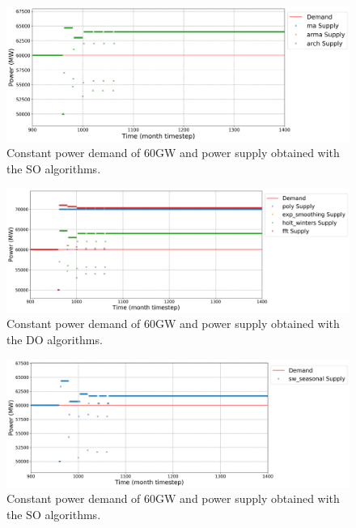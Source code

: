 \documentclass[11pt]{article}
\begin{document}
\begin{figure}[H]
	\centering
	\includegraphics[width=\textwidth]{29-figures/29-power0-buffer01.png} 
	\hfill
	\caption{Constant power demand of 60GW and power supply obtained with the SO algorithms.}
	\label{fig:29-NO}
\end{figure}

\begin{figure}[H]
	\centering
	\includegraphics[width=\textwidth]{29-figures/29-power0-buffer02.png} 
	\hfill
	\caption{Constant power demand of 60GW and power supply obtained with the DO algorithms.}
	\label{fig:29-DO}
\end{figure}

\begin{figure}[H]
	\centering
	\includegraphics[width=\textwidth]{29-figures/29-power0-buffer03.png} 
	\hfill
	\caption{Constant power demand of 60GW and power supply obtained with the SO algorithms.}
	\label{fig:29-SO}
\end{figure}
\end{document}
